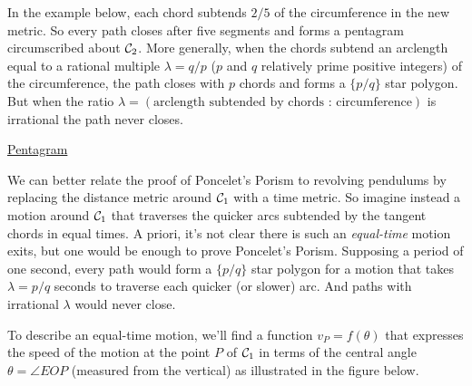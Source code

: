 \documentclass{ximera}
\begin{document}
In the example below, each chord subtends $2/5$ of the circumference in the new metric. So every path closes after five segments and forms a pentagram circumscribed about ${\cal C}_2$. More generally, when the chords subtend an arclength equal to a rational multiple $\lambda = q/p$ ($p$ and $q$ relatively prime positive integers) of the circumference, the path closes with $p$ chords and forms a $\{p/q \}$ star polygon. But when the ratio $\lambda = (\text{arclength subtended by chords : circumference})$ is irrational the path never closes.

\begin{exploration}
\begin{onlineOnly}
    \begin{center}
\end{center}
\end{onlineOnly}

\href{https://www.desmos.com/calculator/qco4rghhfi}{Pentagram}

\end{exploration}

We can better relate the proof of Poncelet's Porism to revolving pendulums by replacing the distance metric around ${\cal C}_1$ with a time metric. So imagine instead a motion around ${\cal C}_1$ that traverses the quicker arcs subtended by the tangent chords in equal times. A priori, it's not clear there is such an \emph{equal-time} motion exits, but one would be enough to prove Poncelet's Porism. Supposing a period of one second, every path would form a $\{p/q \}$ star polygon for a motion that takes $\lambda = p/q$ seconds to traverse each quicker (or slower) arc. And paths with irrational $\lambda$ would never close. 


To describe an equal-time motion, we'll find a function $v_P = f(\theta)$ that expresses the speed of the motion at the point $P$ of ${\cal C}_1$ in terms of the central angle $\theta = \angle EOP$ (measured from the vertical) as illustrated in the figure below.

\begin{exploration}  \label{Exp:4534888989}
\begin{onlineOnly}
    \begin{center}
\end{center}
\end{onlineOnly}
\end{exploration}
\end{document}
